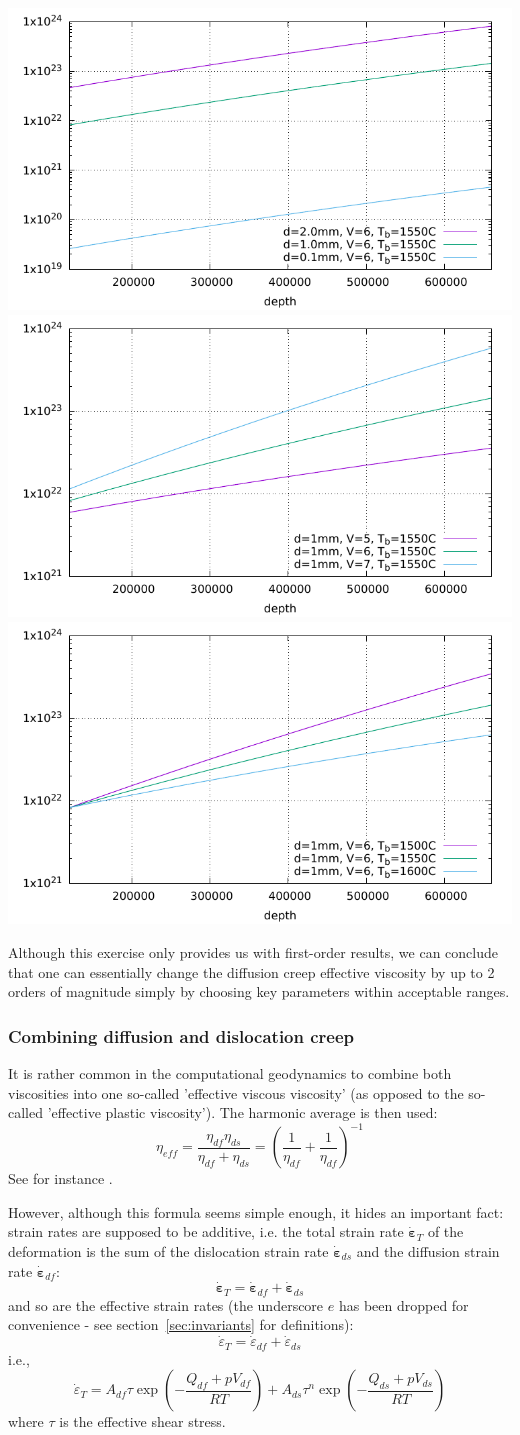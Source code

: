 \begin{center}
\includegraphics[width=5.cm]{images/rheology/kawudiff/viscosity1.pdf}
\includegraphics[width=5.cm]{images/rheology/kawudiff/viscosity2.pdf}
\includegraphics[width=5.cm]{images/rheology/kawudiff/viscosity3.pdf}
\end{center}

Although this exercise only provides us with first-order results, we can conclude that 
one can essentially change the diffusion creep effective viscosity by up to 2 orders of 
magnitude simply by choosing key parameters within acceptable ranges. 


\subsubsection{Combining diffusion and dislocation creep} It is rather common in 
the computational geodynamics to combine both viscosities into one so-called
'effective viscous viscosity' (as opposed to the so-called 'effective plastic viscosity').
The harmonic average is then used:
\begin{equation}
\eta_{eff} = \frac{\eta_{df}\eta_{ds}}{\eta_{df}+\eta_{ds}} 
=\left( \frac{1}{\eta_{df}}+\frac{1}{\eta_{df}} \right)^{-1}
\end{equation}
See for instance \cite{king16}.

However, although this formula seems simple enough, it hides an important fact: 
strain rates are supposed to be additive, i.e. the total strain rate $\dot{\bm \varepsilon}_T$ of the deformation
is the sum of the dislocation strain rate $\dot{\bm \varepsilon}_{ds}$ and the diffusion 
strain rate $\dot{\bm \varepsilon}_{df}$:
\[
\dot{\bm \varepsilon}_{T}=\dot{\bm \varepsilon}_{df}+\dot{\bm \varepsilon}_{ds}
\]
and so are the effective strain rates (the underscore $e$ has been dropped for convenience - see
section~\ref{sec:invariants} for definitions):
\[
\dot{\varepsilon}_{T}=\dot{\varepsilon}_{df}+\dot{\varepsilon}_{ds}
\]
i.e., 
\[
\dot{\varepsilon}_{T}= 
A_{df} \tau \exp\left(-\frac{Q_{df}+pV_{df}}{RT}\right)
+
A_{ds} \tau^n \exp\left(-\frac{Q_{ds}+pV_{ds}}{RT}\right)
\]
where $\tau$ is the effective shear stress.

